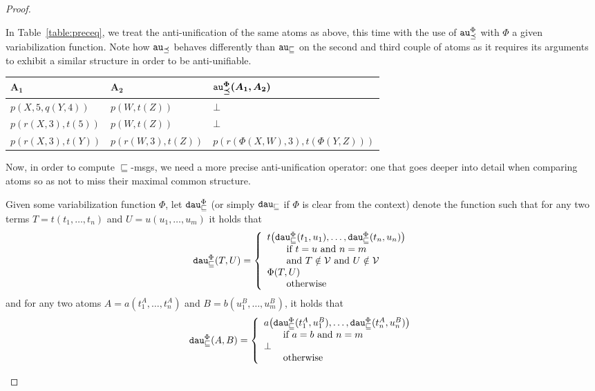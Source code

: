 \begin{proof}
\begin{example}
	In Table~\ref{table:preceq}, we treat the anti-unification of the same atoms as above, this time with the use of $\texttt{au}_\preceq^\Phi$ with $\Phi$ a given variabilization function. Note how $\texttt{au}_\preceq$ behaves differently than $\texttt{au}_\sqsubseteq$ on the second and third couple of atoms as it requires its arguments to exhibit a similar structure in order to be anti-unifiable.
\end{example}

\begin{table*}
	\caption{Example results for $au_\preceq^\Phi$}
	\label{table:preceq}
	\centering
	\begin{tabular}{l|l|l}
		$\bm{A_1}$ & $\bm{A_2}$ & $\bm{\texttt{au}_\preceq^\Phi(A_1, A_2)}$\\\hline 
		$p(X, 5, q(Y,4))$ & $p(W,t(Z))$ & $\bot$\\\hline 
		$p(r(X,3), t(5))$ & $p(W, t(Z))$ & $\bot$\\\hline 
		$p(r(X,3), t(Y))$ & $p(r(W,3),t(Z))$ & $p(r(\Phi(X,W),3), t(\Phi(Y,Z)))$ %
	\end{tabular}
\end{table*}

Now, in order to compute $\sqsubseteq$-msgs, we need a more precise anti-unification operator: one that goes deeper into detail when comparing atoms so as not to miss their maximal common structure. 
\begin{definition} %
	Given some variabilization function $\Phi$, let $\texttt{dau}^\Phi_\sqsubseteq$ (or simply $\texttt{dau}_\sqsubseteq$ if $\Phi$ is clear from the context) denote the function such that for any two terms $T = t(t_1, \dots, t_n)$ and $U = u(u_1, \dots, u_m)$ it holds that 
	\[\texttt{dau}^\Phi_\sqsubseteq(T,U)=\left\{\begin{array}{l}
		
		t\big(\texttt{dau}^\Phi_\sqsubseteq(t_1,u_1), \dots, \texttt{dau}^\Phi_\sqsubseteq(t_n, u_n)\big) 
		\\ \qquad \mbox{if } t = u \mbox{ and } n = m 
		\\ \qquad \mbox{and } T \notin \mathcal{V} \mbox{ and } U \notin \mathcal{V}
		\\ \Phi(T,U) 
		\\ \qquad \mbox{otherwise}
	\end{array}\right.\]
	and for any two atoms $A = a(t^A_1, \dots, t^A_n)$ and $B = b(u^B_1, \dots, u^B_m)$, it holds that
	\[\texttt{dau}^\Phi_\sqsubseteq(A,B)=\left\{\begin{array}{l}
		a\big(\texttt{dau}^\Phi_\sqsubseteq(t^A_1, u^B_1),\dots, \texttt{dau}^\Phi_\sqsubseteq(t^A_n, u^B_n)\big) 
		\\ \qquad \mbox{if } a = b \mbox{ and } n = m 
		\\ \bot
		\\ \qquad \mbox{otherwise}
	\end{array}\right.\]
\end{definition}


\end{proof}
